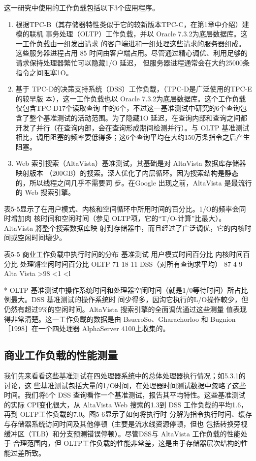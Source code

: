 这一研究中使用的工作负载包括以下3个应用程序。

\begin{enumerate}
    \item 根据TPC-B（其存储器特性类似于它的较新版本TPC-C，在第1章中介绍）建模的联机
    事务处理（OLTP）工作负载，并以 Oracle 7.3.2为底层数据库。这一工作负载由一组发出请求
    的客户端进和一组处理这些请求的服务器组成。这些服务器进程占用 85%
    时间由客户端占用。尽管通过精心调优、利用足够的请求保持处理器繁忙可以隐藏1/O 延迟，
    但服务器进程通常会在大约25000条指令之间阻塞1O。
    \item 基于 TPC-D的决策支持系统（DSS）工作负载，（TPC-D是广泛使用的TPC-E的较早版
    本），这一工作负载也以 Oracle 7.3.2为底层数据库。这个工作负载仅包含TPC-D17个读取查询
    中的6个，不过这一基准测试中研究的6个查询包含了整个基准测试的活动范围。为了隐藏1O
    延迟，在查询内部和查询之间都开发了并行（在查询内部，会在查询形成期间检测并行）。与 OLTP
    基准测试相比，调用阻塞的频率要低得多；这6个查询平均在大约150万条指令之后产生阻塞。
    \item Web 索引搜索（AltaVista）基准测试，其基础是对 AltaVista 数据库存储器映射版本
    （200GB）的搜索。深人优化了内层循环。因为搜索结构是静态的，所以线程之间几乎不需要同
    步。在Google 出现之前，AltaVista 是最流行的 Web 搜索引擎。
\end{enumerate}

表5-5显示了在用户模式、内核和空间循环中所用时间的百分比。1/O的频率会同时增加肉
核时间和空闲时间（参见 OLTP项，它的“T/O-计算”比最大）。AltaVista 將整个搜索数据库映
射到存储器中，而且经过了广泛调优，它的内核时间或空闲时间壞少。

表5-5 商业工作负载中执行时间的分布
基准测试
用户模式时间百分比
内核时间百分比
处理锵空闲时间百分比
OLTP
71
18
11
DSS（对所有查询求平均）
87
4
9
Alta Vista
>98
<1
<l

* OLTP 基准测试中搡作系统时间和处理器空闲时间（就是1/0等待时间）所占比例最大。DSS 基准测试的操作系统时
间少得多，因沟它执行的L/O操作較少，但仍然有超过9\%的空闲时间。AltaVista 搜索引擎的全面调优通过这些测量
值表现得非常清楚。这一工作负載的数据是由 BsucroSo、Gharachorloo 和 Bugnion ［1998］在一个四处理器 AlphaServer
4100上收集的。

\subsection{商业工作负载的性能测量}
我们先来看看这些基准测试在四处理器系统中的总体处理器执行情况；如5.3.1的讨论，这
些基准测试包括大量的1/O时间，在处理器时间测试数据中忽略了这些时间。我们将6个 DSS
查询看作一个基准测试，报告其平均特性。这些基准测试的实际 CPI变化很大，从 AltaVista Web
搜索的1.3到 DSS 工作负载的平均1.6，再到 OLTP工作负载的7.0。图5-6显示了如何将执行时
分解为指令执行时间、缓存与存储器系统访问时间及其他停顿（主要是流水线资源停顿，但也
包括转换旁视缓冲区（TLB）和分支预测错误停顿）。尽管DSS与 AltaVista 工作负载的性能处于
合理范围内，但 OLTP工作负载的性能非常差，这是由于存储器层次结构的性能过差所致。


